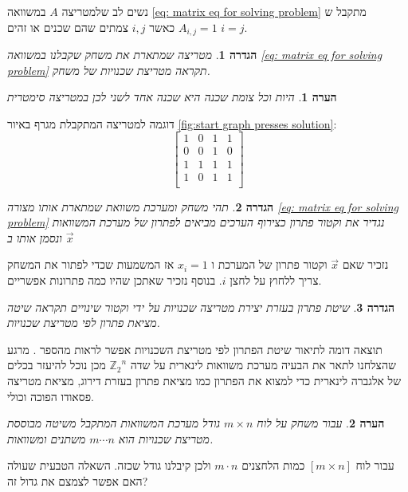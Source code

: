 \documentclass[12pt,leqno]{article}
\theoremstyle{theoremdd}
\newtheorem{definition}{הגדרה}[section]
\newtheorem{comm}{הערה}[section]
\newcommand{\Zn}{{\mathbb{Z}_2}^n}
\begin{document}
נשים לב שלמטריצה
$A$
במשוואה
\ref{eq: matrix eq for solving problem}
מתקבל ש
$A_{i,j} = 1$
כאשר 
$i, j$
צמתים שהם שכנים או זהים
$i = j$.
\begin{definition}
    \label{def: neighbor matrix}
    מטריצה שמתארת את משחק 
    שקבלנו במשוואה
    \ref{eq: matrix eq for solving problem}
    תקראה מטריצת שכנויות של משחק.
\end{definition}
\begin{comm}
    \label{comm: symetic matrix}
    היות וכל צומת שכנה היא שכנה אחד לשני לכן במטריצה
    סימטרית
\end{comm}
דוגמה למטריצה  המתקבלת מגרף באיור 
\ref{fig:start graph presses solution}:
\[
    \begin{bmatrix}
        1 & 0 & 1 & 1\\
        0 & 0 & 1 & 0\\
        1 & 1 & 1 & 1\\
        1 & 0 & 1 & 1\\
    \end{bmatrix}
\]

\begin{definition}
    \label{ def: solution vector}
    תהי משחק ומערכת משוואת שמתארת אותו מצורה 
    \ref{eq: matrix eq for solving problem} 
    נגדיר את וקטור פתרון כצירוף הערכים מביאים לפתרון
    של מערכת המשוואות
    ונסמן אותו ב
    $\vec{x}$
\end{definition}
נזכיר שאם
$\vec{x}$
וקטור פתרון של המערכת 
ו
$x_i = 1$
אז המשמעות שכדי לפתור את המשחק
צריך ללחוץ על לחצן 
$i$.
בנוסף 
נזכיר שאתכן שהיו כמה פתרונות אפשריים.
\begin{definition}
    \label{def: standard solution}
    שיטת פתרון בעזרת יצירת  מטריצה שכנויות על ידי וקטור שינויים תקראה
    שיטה מציאת פתרון לפי מטריצת שכנויות.
\end{definition}
תוצאה דומה
לתיאור שיטת הפתרון לפי מטריצת השכנויות 
אפשר לראות מהספר
\cite{B2}.
מרגע שהצלחנו לתאר את הבעיה מערכת משוואות לינארית
על שדה
$\Zn$
מכן נוכל להיעזר בכלים של אלגברה לינארית כדי למצוא את הפתרון כמו מציאת פתרון בעזרת דירוג,
מציאת מטריצה פסאודו הפוכה וכולי. 
\begin{comm}
    \label{comm: for board too many variables}
    עבור משחק על לוח 
    $m \times n$
    גודל מערכת המשוואות המתקבל משיטה 
    מבוססת מטריצת שכנויות 
    הוא 
    $m \cdots n$
    משתנים ומשוואות.
\end{comm}
עבור לוח 
$[m \times n]$
כמות הלחצנים 
$m \cdot n$
ולכן 
קיבלנו גודל שכזה.
השאלה הטבעית שעולה האם אפשר לצמצם את גדול זה?
\end{document}

